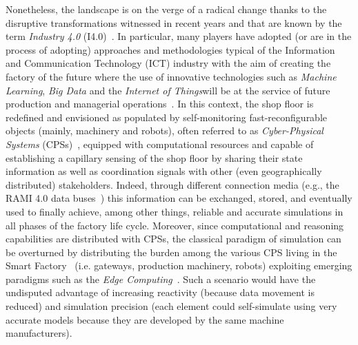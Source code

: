 Nonetheless, the landscape is on the verge of a radical change thanks to the disruptive transformations witnessed in recent years and that are known by the term \textit{Industry 4.0} (I4.0)~\cite{Lu2017}. In particular, many players have adopted (or are in the process of adopting) approaches and methodologies typical of the Information and Communication Technology (ICT) industry with the aim of creating the factory of the future where the use of innovative technologies such as \textit{Machine Learning}, \textit{Big Data} and the \textit{Internet of Things}will be at the service of future production and managerial operations~\cite{Witkowski2017,Xu2014}.
In this context, the shop floor is redefined and envisioned as populated by self-monitoring fast-reconfigurable objects (mainly, machinery and robots), often referred to as \textit{Cyber-Physical Systems} (CPSs)~\cite{Jazdi2014}, equipped with computational resources and capable of establishing a capillary sensing of the shop floor by sharing their state information as well as coordination signals with other (even geographically distributed) stakeholders. 
Indeed, through different connection media (e.g., the RAMI 4.0 data buses~\cite{hankel2015reference}) this information can be exchanged, stored, and eventually used to finally achieve, among other things, reliable and accurate simulations in all phases of the factory life cycle. 
Moreover, since computational and reasoning capabilities are distributed with CPSs, 
the classical paradigm of simulation can be overturned by distributing the burden among the various CPS living in the Smart Factory~\cite{Lee2015,Hozdic2015} (i.e. gateways, production machinery, robots) exploiting emerging paradigms such as the \textit{Edge Computing}~\cite{georgakopoulos2016internet}. Such a scenario would have the undisputed advantage of increasing reactivity (because data movement is reduced) and simulation precision (each element could self-simulate using very accurate models because they are developed by the same machine manufacturers). 


